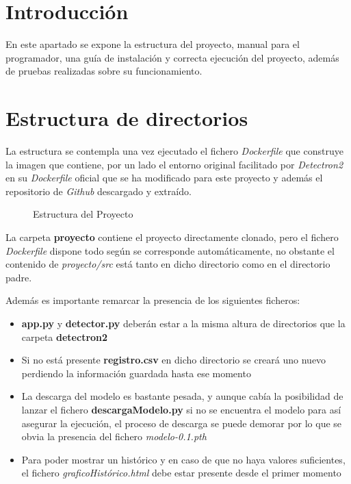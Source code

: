 
\section{Introducción}
En este apartado se expone la estructura del proyecto, manual para el programador, una guía de instalación y correcta ejecución del proyecto, además de pruebas realizadas sobre su funcionamiento.

\section{Estructura de directorios}
La estructura se contempla una vez ejecutado el fichero \emph{Dockerfile} que construye la imagen que contiene, por un lado el entorno original facilitado por \emph{Detectron2} en su \emph{Dockerfile} oficial que se ha modificado para este proyecto y además el repositorio de \emph{Github} descargado y extraído.


\begin{figure}[h]
	\caption{Estructura del Proyecto}
	\label{esquemadirectorios}
\end{figure}

La carpeta \textbf{proyecto} contiene el proyecto directamente clonado, pero el fichero \emph{Dockerfile} dispone todo según se corresponde automáticamente, no obstante el contenido de \emph{proyecto/src} está tanto en dicho directorio como en el directorio padre.

Además es importante remarcar la presencia de los siguientes ficheros:

\begin{itemize}
    \item \textbf{app.py} y \textbf{detector.py} deberán estar a la misma altura de directorios que la carpeta \textbf{detectron2}
    \item Si no está presente \textbf{registro.csv} en dicho directorio se creará uno nuevo perdiendo la información guardada hasta ese momento
    \item La descarga del modelo es bastante pesada, y aunque cabía la posibilidad de lanzar el fichero \textbf{descargaModelo.py} si no se encuentra el modelo para así asegurar la ejecución, el proceso de descarga se puede demorar por lo que se obvia la presencia del fichero \emph{modelo-0.1.pth}
\clearpage
    \item Para poder mostrar un histórico y en caso de que no haya valores suficientes, el fichero \emph{graficoHistórico.html} debe estar presente desde el primer momento
\end{itemize}


